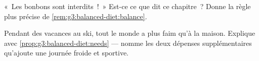 \begin{exercise}[$\star\star$]\label{exo:g3:balanced-diet:9}
«~Les bonbons sont interdits~!~» Est-ce ce que dit ce chapitre~?
Donne la règle plus précise de \cref{rem:g3:balanced-diet:balance}.
\end{exercise}

\begin{exercise}[$\star\star$]\label{exo:g3:balanced-diet:10}
Pendant des vacances au ski, tout le monde a plus faim qu'à la
maison. Explique avec \cref{prop:g3:balanced-diet:needs} --- nomme
les deux dépenses supplémentaires qu'ajoute une journée froide et
sportive.
\end{exercise}
